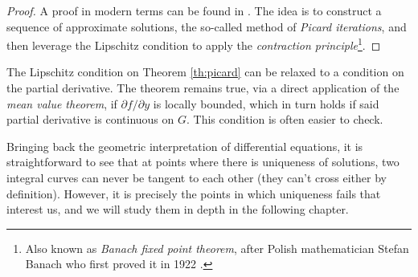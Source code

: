 \begin{proof}
  A proof in modern terms can be found in \cite[36]{teschl2012ordinary}. The idea is to construct a sequence of approximate solutions, the so-called method of \textit{Picard iterations}, and then leverage the Lipschitz condition to apply the \textit{contraction principle}\footnote{Also known as \textit{Banach fixed point theorem}, after Polish mathematician Stefan Banach who first proved it in 1922 \cite{banach1922operations}.}.
\end{proof}

\begin{remark}
  The Lipschitz condition on Theorem \ref{th:picard} can be relaxed to a condition on the partial derivative. The theorem remains true, via a direct application of the \textit{mean value theorem}, if $\partial f / \partial y$ is locally bounded, which in turn holds if said partial derivative is continuous on $G$. This condition is often easier to check.
\end{remark}

Bringing back the geometric interpretation of differential equations, it is straightforward to see that at points where there is uniqueness of solutions, two integral curves can never be tangent to each other (they can't cross either by definition). However, it is precisely the points in which uniqueness fails that interest us, and we will study them in depth in the following chapter.
